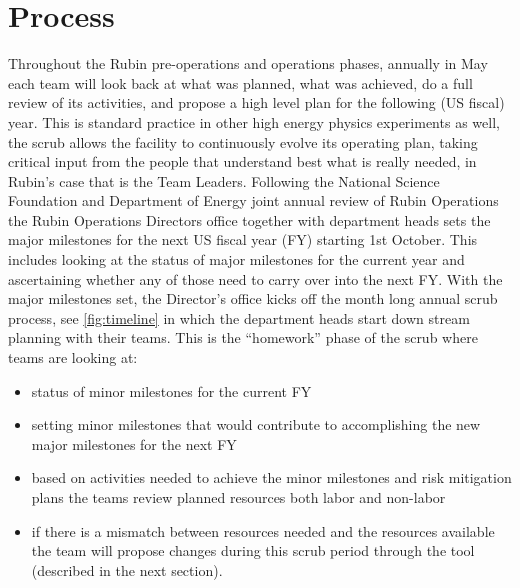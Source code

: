\section{Process} \label{sec:process}


Throughout the Rubin pre-operations and operations phases, annually in May each team will look back at what was planned, what was achieved, do a full review of its activities, and propose a high level plan for the following (US fiscal) year.
This is standard practice in other high energy physics experiments as well, the scrub allows the facility to continuously evolve its operating plan, taking critical input from the people that understand best what is really needed, in Rubin’s case that is the Team Leaders.
Following the National Science Foundation and Department of Energy joint annual review of Rubin Operations the Rubin Operations Directors office together with department heads sets the major milestones for the next US fiscal year (FY) starting 1st October. This includes looking at the status of major milestones for the current year and ascertaining whether any of those need to carry over into the next FY.
With the major milestones set, the Director’s office kicks off the month long annual scrub process, see \autoref{fig:timeline} in which the department heads start down stream planning with their teams. This is the “homework” phase of the scrub where teams are looking at:

\begin{itemize}
\item status of minor milestones for the current FY
\item setting minor milestones that would contribute to accomplishing the new major milestones for the next FY
\item based on activities needed to achieve the minor milestones and risk mitigation plans the teams review planned resources both labor and non-labor
\item if there is a mismatch between resources needed and the resources available the team will propose changes during this scrub period through the tool (described in the next section).

\end{itemize}


